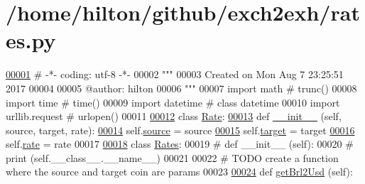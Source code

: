 \hypertarget{rates_8py_source}{}\section{/home/hilton/github/exch2exh/rates.py}

\begin{DoxyCode}
\hypertarget{rates_8py_source.tex_l00001}{}\hyperlink{namespacerates}{00001} \textcolor{comment}{# -*- coding: utf-8 -*-}
00002 \textcolor{stringliteral}{"""}
00003 \textcolor{stringliteral}{Created on Mon Aug  7 23:25:51 2017}
00004 \textcolor{stringliteral}{}
00005 \textcolor{stringliteral}{@author: hilton}
00006 \textcolor{stringliteral}{"""}
00007 \textcolor{keyword}{import} math           \textcolor{comment}{# trunc()}
00008 \textcolor{keyword}{import} time           \textcolor{comment}{# time()}
00009 \textcolor{keyword}{import} datetime       \textcolor{comment}{# class datetime}
00010 \textcolor{keyword}{import} urllib.request \textcolor{comment}{# urlopen()}
00011 
\hypertarget{rates_8py_source.tex_l00012}{}\hyperlink{classrates_1_1_rate}{00012} \textcolor{keyword}{class }\hyperlink{classrates_1_1_rate}{Rate}: 
\hypertarget{rates_8py_source.tex_l00013}{}\hyperlink{classrates_1_1_rate_a935221ad61f9c683e6da812ac7f53cc3}{00013}     \textcolor{keyword}{def }\hyperlink{classrates_1_1_rate_a935221ad61f9c683e6da812ac7f53cc3}{\_\_init\_\_} (self, source, target, rate): 
\hypertarget{rates_8py_source.tex_l00014}{}\hyperlink{classrates_1_1_rate_a82a6abb7536f2a4393f43456cfb1dc5e}{00014}         self.\hyperlink{classrates_1_1_rate_a82a6abb7536f2a4393f43456cfb1dc5e}{source} = source
\hypertarget{rates_8py_source.tex_l00015}{}\hyperlink{classrates_1_1_rate_adb1bbb0977c838106cb181a5941612c8}{00015}         self.\hyperlink{classrates_1_1_rate_adb1bbb0977c838106cb181a5941612c8}{target} = target
\hypertarget{rates_8py_source.tex_l00016}{}\hyperlink{classrates_1_1_rate_a5a660cfdfaa515a6e5809492525d61a7}{00016}         self.\hyperlink{classrates_1_1_rate_a5a660cfdfaa515a6e5809492525d61a7}{rate}   = rate        
00017         
\hypertarget{rates_8py_source.tex_l00018}{}\hyperlink{classrates_1_1_rates}{00018} \textcolor{keyword}{class }\hyperlink{classrates_1_1_rates}{Rates}:
00019 \textcolor{comment}{#    def \_\_init\_\_ (self):}
00020 \textcolor{comment}{#        print (self.\_\_class\_\_.\_\_name\_\_)}
00021 
00022     \textcolor{comment}{# TODO create a function where the source and target coin are params}
00023     
\hypertarget{rates_8py_source.tex_l00024}{}\hyperlink{namespacerates_a083f2cdcd71554d301bcbfb0779ffa49}{00024}     \textcolor{keyword}{def }\hyperlink{namespacerates_a083f2cdcd71554d301bcbfb0779ffa49}{getBrl2Usd} (self):

\end{DoxyCode}
